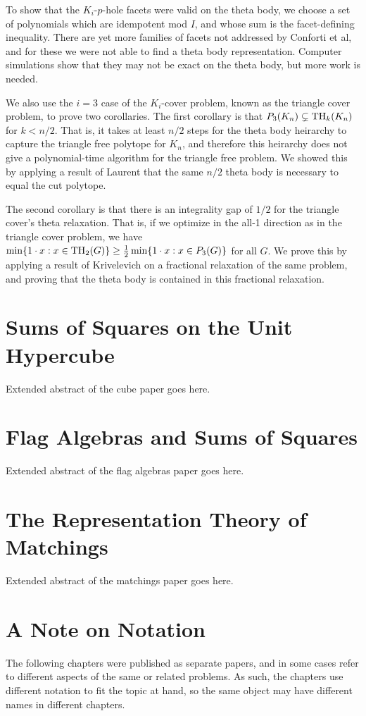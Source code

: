 To show that the $K_i$-$p$-hole facets were valid on the theta body, we choose a set of 
polynomials which are idempotent mod $I$, and whose sum is the facet-defining
inequality. There are yet more families of facets not addressed by Conforti 
et al, and for these we were not able to find a theta body representation. 
Computer simulations show that they may not be exact on the theta body, but
more work is needed.

We also use the $i=3$ case of the $K_i$-cover problem, known as the triangle
cover problem, to prove two corollaries. 
The first corollary is that $P_3(K_n) \subsetneq \textup{TH}_{k}(K_n)$ for $k < n/2$.
That is, it takes at least $n/2$ steps for the theta body heirarchy to capture the triangle free polytope for $K_n$, and therefore this heirarchy does not give a polynomial-time algorithm for the triangle free problem.
We showed this by applying a result of Laurent that the same $n/2$ theta body is necessary to equal the cut polytope.

The second corollary is that there is an integrality gap of $1/2$ for the triangle cover's theta relaxation. 
That is, if we optimize in the all-1 direction as in the triangle cover problem, we have $\min \{1 \cdot x: x \in \textup{TH}_2(G) \} \ge \frac{1}{2} \min \{1 \cdot x: x \in P_3(G)\}$ for all $G$. 
We prove this by applying a result of Krivelevich on a fractional relaxation of the same problem, and proving that the theta body is contained in this fractional relaxation.

\section{Sums of Squares on the Unit Hypercube}

Extended abstract of the cube paper goes here.

\section{Flag Algebras and Sums of Squares}

Extended abstract of the flag algebras paper goes here.

\section{The Representation Theory of Matchings}

Extended abstract of the matchings paper goes here.

\section{A Note on Notation}
The following chapters were published as separate papers, and in some cases
refer to different aspects of the same or related problems. As such, the 
chapters use different notation to fit the topic at hand, so the same object
may have different names in different chapters.
